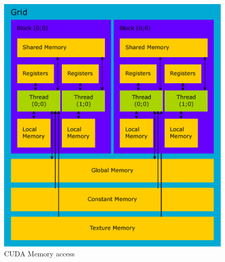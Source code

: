 \begin{figure}[h]
  \centering
  \includegraphics[width=0.6\linewidth]{img/CUDAmemAccess.eps}
  \caption{CUDA Memory access}
  \label{fig:cudamemaccess}
\end{figure}%

